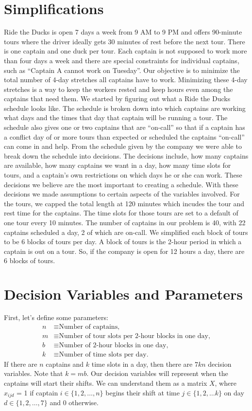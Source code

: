 \documentclass[12pt]{article}
\begin{document}
\section*{Simplifications}
Ride the Ducks is open 7 days a week from 9 AM to 9 PM and offers 90-minute tours 
where the driver ideally gets 30 minutes of rest before the next tour. There is one captain 
and one duck per tour. Each captain is not supposed to work more than four days a week 
and there are special constraints for individual captains, such as “Captain A cannot work 
on Tuesday”. Our objective is to minimize the total number of 4-day stretches all captains 
have to work. Minimizing these 4-day stretches is a way to keep the workers rested and 
keep hours even among the captains that need them.  We started by figuring out what a 
Ride the Ducks schedule looks like. The schedule is broken down into which captains are
working what days and the times that day that captain will be running a tour. The 
schedule also gives one or two captains that are “on-call” so that if a captain has a 
conflict day of or more tours than expected or scheduled the captains “on-call” can come 
in and help. From the schedule given by the company we were able to break down the 
schedule into decisions. The decisions include, how many captains are available, how 
many captains we want in a day, how many time slots for tours, and a captain’s own 
restrictions on which days he or she can work. These decisions we believe are the most 
important to creating a schedule. With these decisions we made assumptions to certain 
aspects of the variables involved. For the tours, we capped the total length at 120 minutes 
which incudes the tour and rest time for the captains. The time slots for those tours are set 
to a default of one tour every 10 minutes. The number of captains in our problem is 40, 
with 22 captains scheduled a day, 2 of which are on-call. We simplified each block of 
tours to be 6 blocks of tours per day. A block of tours is the 2-hour period in which a 
captain is out on a tour. So, if the company is open for 12 hours a day, there are 6 blocks 
of tours.


\section*{Decision Variables and Parameters} First, let's define some parameters:
\begin{align*}
n &\equiv \text{Number of captains,}\\
m &\equiv \text{Number of tour slots per 2-hour blocks in one day,}\\
b &\equiv \text{Number of 2-hour blocks in one day,}\\
k &\equiv \text{Number of time slots per day.}
\end{align*}
If there are $n$ captains and $k$ time slots in a day, then there are $7kn$ decision variables. Note that $k = mb$. Our decision variables will represent when the captains will start their shifts. We can understand them as a matrix $X$, where $x_{ijd}$ = 1 if captain $i \in \{1, 2, \dots, n\}$ begins their shift at time $j \in \{1, 2, \dots k\}$ on day $d \in \{1, 2, \dots, 7\}$ and 0 otherwise.
\end{document}
